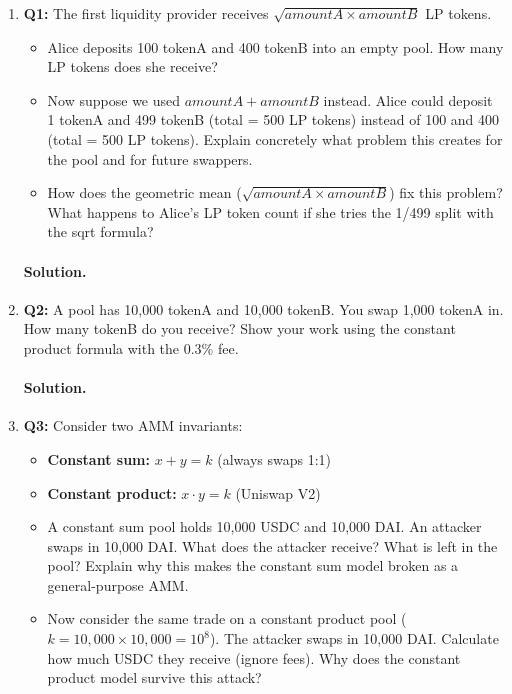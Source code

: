 \documentclass{article}
\begin{document}
\begin{enumerate}

    \item \textbf{Q1:} The first liquidity provider receives $\sqrt{amountA \times amountB}$ LP tokens.

    \begin{itemize}
        \item[(a)] Alice deposits 100 tokenA and 400 tokenB into an empty pool. How many LP tokens does she receive?
        \item[(b)] Now suppose we used $amountA + amountB$ instead. Alice could deposit 1 tokenA and 499 tokenB (total = 500 LP tokens) instead of 100 and 400 (total = 500 LP tokens). Explain concretely what problem this creates for the pool and for future swappers.
        \item[(c)] How does the geometric mean ($\sqrt{amountA \times amountB}$) fix this problem? What happens to Alice's LP token count if she tries the 1/499 split with the sqrt formula?
    \end{itemize}

    \paragraph{Solution.}

    \vspace{3em}

    \item \textbf{Q2:} A pool has 10{,}000 tokenA and 10{,}000 tokenB. You swap 1{,}000 tokenA in. How many tokenB do you receive? Show your work using the constant product formula with the 0.3\% fee.

    \paragraph{Solution.}

    \vspace{3em}

    \item \textbf{Q3:} Consider two AMM invariants:
    \begin{itemize}
        \item \textbf{Constant sum:} $x + y = k$ \quad (always swaps 1:1)
        \item \textbf{Constant product:} $x \cdot y = k$ \quad (Uniswap V2)
    \end{itemize}

    \begin{itemize}
        \item[(a)] A constant sum pool holds 10{,}000 USDC and 10{,}000 DAI. An attacker swaps in 10{,}000 DAI. What does the attacker receive? What is left in the pool? Explain why this makes the constant sum model broken as a general-purpose AMM.
        \item[(b)] Now consider the same trade on a constant product pool ($k = 10{,}000 \times 10{,}000 = 10^8$). The attacker swaps in 10{,}000 DAI. Calculate how much USDC they receive (ignore fees). Why does the constant product model survive this attack?
    \end{itemize}


\end{enumerate}
\end{document}
